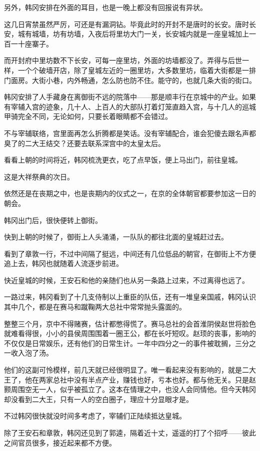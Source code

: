 另外，韩冈安排在外面的耳目，也是一晚上都没有回报说有异状。

这几日宵禁虽然严厉，可还是有漏洞钻。毕竟此时的开封不是唐时的长安。唐时长安，城有城墙，坊有坊墙，入夜后将里坊大门一关，长安城内就是一座皇城加上一百一十座寨子。

而开封府中里坊数不下长安，可每一座里坊，外面的坊墙都没了。弄得与后世一样，一个个破墙开店，除了皇城左近的一圈里坊，大多数里坊，临着大街都是一排门面房。大街小巷，内外畅通，怎么防也防不住。能守的，也就几条大街的街口。

韩冈安排了人手藏身在离御街不远的院落中——那是顺丰行在京城中的产业。如果有宰辅入宫的迹象，几十人、上百人的大部队打着灯笼直趋入宫，与十几人的巡城甲骑完全不同，无论如何，只要长着眼睛都不会错过。

不与宰辅联络，宫里面再怎么折腾都是笑话。没有宰辅配合，谁会犯傻去跟名声都臭了的二大王结交？还要去联系深宫中的太皇太后。

看看上朝的时间将近，韩冈梳洗更衣，吃了点早饭，便上马出门，前往皇城。

这是大祥祭典的次日。

依然还是在丧期之中，也是丧期内的仪式之一，在京的全体朝官都要参加这一日的朝会。

韩冈出门后，很快便转上御街。

快到上朝的时候了，御街上人头涌涌，一队队的都往北面的皇城赶过去。

看到了章敦一行，不过中间隔了挺远，中间还有几位低品的朝官，在御街上不方便追上去，韩冈也就随着人流逐步前进。

快近皇城的时候，王安石和他的亲随们也从另一条路上过来，不过离得也远了。

一路过来，韩冈看到了十几支侍制以上重臣的队伍，还有一堆皇亲国戚，韩冈认识其中几个，都是在赛马和蹴鞠两大总社中常常抛头露面的。

整整三个月，京中不得赌赛，估计都憋得慌了。赛马总社的会首淮阴侯赵世将脸色就难看得很，小小的县侯周围围着一圈王公，都在长吁短叹。赵顼的丧事，影响的不仅仅是日常娱乐，还有他们的日常生计。一年中四分之一的事件被耽搁，三分之一收入泡了汤。

他们的这副可怜模样，前几天就已经很明显了。唯一看起来没有影响的，就是二大王了，他在两家总社中没有半点产业，赚钱也好，亏本也好。都与他无关。只是赵颢周围空无一人，似乎被孤立了。这本在情理之中，也没人会同情他。但今天韩冈却没看到二大王，只有一人的空白圈子，理应十分显眼才是。

不过韩冈很快就没时间多考虑了，宰辅们正陆续抵达皇城。

除了王安石和章敦，韩冈还见到了郭逵，隔着近十丈，遥遥的打了个招呼——彼此之间官员很多，接近起来都不方便。

